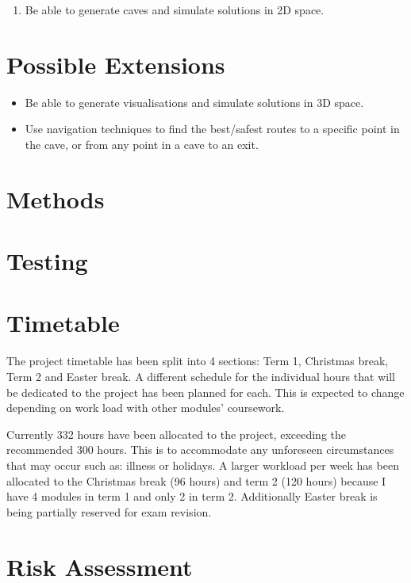 \documentclass{article}
\begin{document}
\begin{enumerate}
    \item Be able to generate caves and simulate solutions in 2D space.
    
\end{enumerate}


\section{Possible Extensions}

\begin{itemize}
    \item Be able to generate visualisations and simulate solutions in 3D space.
    \item Use navigation techniques to find the best/safest routes to a specific point in the cave, or from any point in a cave to an exit.
\end{itemize}

\section{Methods}

\section{Testing}

\section{Timetable}

The project timetable has been split into 4 sections: Term 1, Christmas break, Term 2 and Easter break. A different schedule for the individual hours that will be dedicated to the project has been planned for each. This is expected to change depending on work load with other modules' coursework.




Currently 332 hours have been allocated to the project, exceeding the recommended 300 hours. This is to accommodate any unforeseen circumstances that may occur such as: illness or holidays. A larger workload per week has been allocated to the Christmas break (96 hours) and term 2 (120 hours) because I have 4 modules in term 1 and only 2 in term 2. Additionally Easter break is being partially reserved for exam revision.

\section{Risk Assessment}
\end{document}
